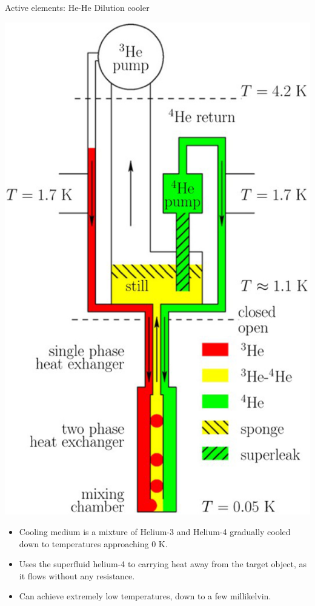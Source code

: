 \documentclass{cubeamer}
\begin{document}
\begin{frame}{Active elements: He-He Dilution cooler}

    \begin{minipage}{0.3\textwidth}
            \includegraphics[width=0.8\linewidth]{Figures/He_He_dilution_diag.png} 

    \end{minipage}
    \begin{minipage}{0.65\textwidth}
    \begin{itemize}
        \item Cooling medium is a mixture of Helium-3 and Helium-4 gradually cooled down to temperatures approaching 0 K. 
        \item Uses the superfluid helium-4 to carrying heat away from the target object, as it flows without any resistance.
        \item Can achieve extremely low temperatures, down to a few millikelvin.
    \end{itemize}
    \end{minipage}

\end{frame}
\end{document}
